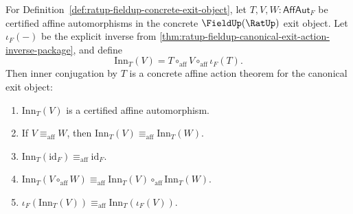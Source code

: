 \begin{theorem}
\label{thm:ratup-fieldup-affine-inner-conjugation-exit}
For Definition~\ref{def:ratup-fieldup-concrete-exit-object}, let
$T,V,W:\mathsf{AffAut}_F$ be certified affine automorphisms in the concrete
$\FieldUp(\RatUp)$ exit object. Let $\iota_F(-)$ be the explicit inverse from
\autoref{thm:ratup-fieldup-canonical-exit-action-inverse-package}, and define
$$
\mathrm{Inn}_T(V)=T\circ_{\mathrm{aff}}V\circ_{\mathrm{aff}}\iota_F(T).
$$
Then inner conjugation by $T$ is a concrete affine action theorem for the
canonical exit object:
\begin{enumerate}
\item $\mathrm{Inn}_T(V)$ is a certified affine automorphism.
\item If $V\equiv_{\mathrm{aff}}W$, then
$\mathrm{Inn}_T(V)\equiv_{\mathrm{aff}}\mathrm{Inn}_T(W)$.
\item $\mathrm{Inn}_T(\mathrm{id}_F)\equiv_{\mathrm{aff}}\mathrm{id}_F$.
\item
$\mathrm{Inn}_T(V\circ_{\mathrm{aff}}W)\equiv_{\mathrm{aff}}
\mathrm{Inn}_T(V)\circ_{\mathrm{aff}}\mathrm{Inn}_T(W)$.
\item
$\iota_F(\mathrm{Inn}_T(V))\equiv_{\mathrm{aff}}
\mathrm{Inn}_T(\iota_F(V))$.
\end{enumerate}
\end{theorem}
